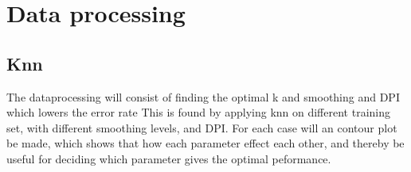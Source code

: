 \section{Data processing}
\subsection{Knn}
The dataprocessing will consist of finding the optimal k and smoothing and DPI which lowers the error rate  This is found by applying knn on different training set, with different smoothing levels, and DPI.  For each case will an contour plot be made, which shows that how each parameter effect each other, and thereby be useful for deciding which parameter gives the optimal peformance. 